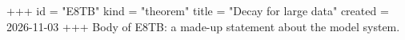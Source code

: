 +++
id = "E8TB"
kind = "theorem"
title = "Decay for large data"
created = 2026-11-03
+++
Body of E8TB: a made-up statement about the model system.

